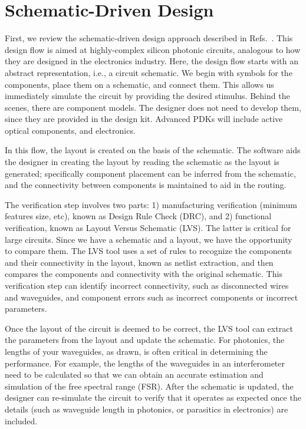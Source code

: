 \documentclass[journal]{spie}
\begin{document}
\section{Schematic-Driven Design}

First, we review the schematic-driven design approach described in Refs.~.   This design flow is aimed at highly-complex silicon photonic circuits, analogous to how they are designed in the electronics industry.  Here, the design flow starts with an abstract representation, i.e., a circuit schematic.  We begin with symbols for the components,  place them on a schematic, and connect them.   This allows us immediately simulate the circuit by providing the desired stimulus.  Behind the scenes, there are component models.  The designer does not need to develop them, since they are provided in the design kit.  Advanced PDKs will include active optical components, and electronics.  

In this flow, the layout is created on the basis of the schematic.  The software aids the designer in creating the layout by reading the schematic as the layout is generated; specifically component placement can be inferred from the schematic, and the connectivity between components is maintained to aid in the routing.

The verification step involves two parts: 1) manufacturing verification (minimum features size, etc), known as Design Rule Check (DRC), and 2) functional verification, known as Layout Versus Schematic  (LVS).  The latter is critical for large circuits.  Since we have a schematic and a layout, we have the opportunity to compare them.  The LVS tool uses a set of rules to recognize the components and their connectivity in the layout, known as netlist extraction, and then compares the components and connectivity with the original schematic.  This verification step can identify incorrect connectivity, such as disconnected wires and waveguides, and component errors such as incorrect components or incorrect parameters.

Once the layout of the circuit is deemed to be correct, the LVS tool can extract the parameters from the layout and update the schematic.  For photonics, the lengths of your waveguides, as drawn, is often critical in determining the performance.  For example, the lengths of the waveguides in an interferometer need to be calculated so that we can obtain an accurate estimation and simulation of the free spectral range (FSR). After the schematic is updated, the designer can re-simulate the circuit to verify that it operates as expected once the details (such as waveguide length in photonics, or parasitics in electronics) are included.
\end{document}
